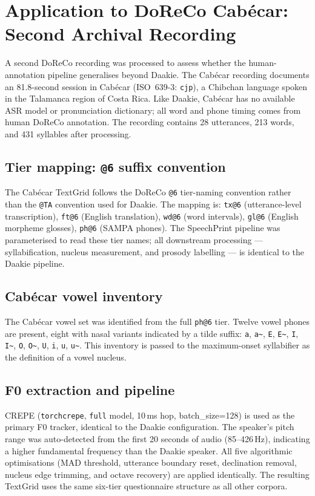 \section{Application to DoReCo Cabécar: Second Archival Recording}
\label{sec:cabeca_pipeline}

A second DoReCo recording was processed to assess whether the human-annotation
pipeline generalises beyond Daakie. The Cabécar recording documents an
81.8-second session in Cabécar (ISO~639-3: \texttt{cjp}), a Chibchan language
spoken in the Talamanca region of Costa Rica. Like Daakie, Cabécar has no
available ASR model or pronunciation dictionary; all word and phone timing
comes from human DoReCo annotation. The recording contains 28 utterances,
213 words, and 431 syllables after processing.

\subsection{Tier mapping: \texttt{@6} suffix convention}

The Cabécar TextGrid follows the DoReCo \texttt{@6} tier-naming convention
rather than the \texttt{@TA} convention used for Daakie. The mapping is:
\texttt{tx@6} (utterance-level transcription), \texttt{ft@6} (English
translation), \texttt{wd@6} (word intervals), \texttt{gl@6} (English morpheme
glosses), \texttt{ph@6} (SAMPA phones). The SpeechPrint pipeline was
parameterised to read these tier names; all downstream processing
--- syllabification, nucleus measurement, and prosody labelling --- is
identical to the Daakie pipeline.

\subsection{Cabécar vowel inventory}

The Cabécar vowel set was identified from the full \texttt{ph@6} tier. Twelve
vowel phones are present, eight with nasal variants indicated by a tilde suffix:
\texttt{a}, \texttt{a\~{}}, \texttt{E}, \texttt{E\~{}}, \texttt{I},
\texttt{I\~{}}, \texttt{O}, \texttt{O\~{}}, \texttt{U}, \texttt{i},
\texttt{u}, \texttt{u\~{}}. This inventory is passed to the maximum-onset
syllabifier as the definition of a vowel nucleus.

\subsection{F0 extraction and pipeline}

CREPE (\texttt{torchcrepe}, \texttt{full} model, 10\,ms hop, batch\_size=128)
is used as the primary F0 tracker, identical to the Daakie configuration. The
speaker's pitch range was auto-detected from the first 20 seconds of audio
(85--426\,Hz), indicating a higher fundamental frequency than the Daakie
speaker. All five algorithmic optimisations (MAD threshold, utterance boundary
reset, declination removal, nucleus edge trimming, and octave recovery) are
applied identically. The resulting TextGrid uses the same six-tier questionnaire
structure as all other corpora.

